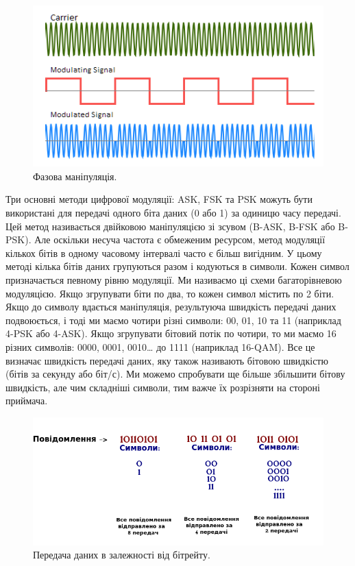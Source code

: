 \documentclass{article}
\begin{document}
\begin{figure}[h!]
	\centering
	\includegraphics[width=0.6\linewidth]{images/psk.png}
	\caption{\label{fig:psk}Фазова маніпуляція.}
\end{figure}

Три основні методи цифрової модуляції: ASK, FSK та PSK можуть бути використані для передачі одного біта даних (0 або 1) за одиницю часу передачі. Цей метод називається двійковою маніпуляцією зі зсувом (B-ASK, B-FSK або B-PSK). Але оскільки несуча частота є обмеженим ресурсом, метод модуляції кількох бітів в одному часовому інтервалі часто є більш вигідним. У цьому методі кілька бітів даних групуються разом і кодуються в символи. Кожен символ призначається певному рівню модуляції. Ми називаємо ці схеми багаторівневою модуляцією. Якщо згрупувати біти по два, то кожен символ містить по 2 біти. Якщо до символу вдається маніпуляція, результуюча швидкість передачі даних подвоюється, і тоді ми маємо чотири різні символи: 00, 01, 10 та 11 (наприклад 4-PSK або 4-ASK). Якщо згрупувати бітовий потік по чотири, то ми маємо 16 різних символів: 0000, 0001, 0010… до 1111 (наприклад 16-QAM). Все це визначає швидкість передачі даних, яку також називають бітовою швидкістю (бітів за секунду або біт/с). Ми можемо спробувати ще більше збільшити бітову швидкість, але чим складніші символи, тим важче їх розрізняти на стороні приймача.

\begin{figure}[h!]
	\centering
	\includegraphics[width=0.8\linewidth]{images/transmittion_speed.png}
	\caption{\label{fig:transmittion_speed} Передача даних в залежності від бітрейту.}
\end{figure}
\end{document}
